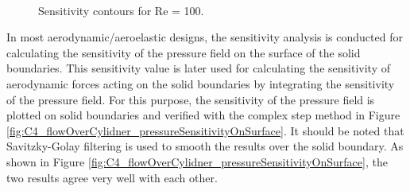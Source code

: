 \begin{figure}[H]
    \centering
    \quad
    \\
    \caption{Sensitivity contours for Re = 100.}
    \label{fig:C4_flowOverCylinderSensitivityContour}
\end{figure}

In most aerodynamic/aeroelastic designs, the sensitivity analysis is conducted for calculating the sensitivity of the pressure field on the surface of the solid boundaries. This sensitivity value is later used for calculating the sensitivity of aerodynamic forces acting on the solid boundaries by integrating the sensitivity of the pressure field. For this purpose, the sensitivity of the pressure field is plotted on solid boundaries and verified with the complex step method in Figure \ref{fig:C4_flowOverCylidner_pressureSensitivityOnSurface}. It should be noted that Savitzky-Golay filtering is used to smooth the results over the solid boundary. As shown in Figure \ref{fig:C4_flowOverCylidner_pressureSensitivityOnSurface}, the two results agree very well with each other.

